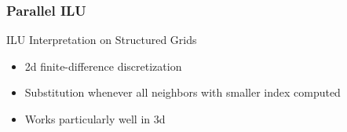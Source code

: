 \begin{frame}[fragile]
\frametitle{Parallel ILU}

     \begin{block}{ILU Interpretation on Structured Grids}
      \begin{itemize}
        \item 2d finite-difference discretization
        \item Substitution whenever all neighbors with smaller index computed
        \item Works particularly well in 3d
      \end{itemize}

      \begin{center}

\end{center}
\end{block}
\end{frame}
